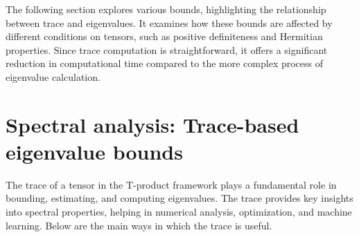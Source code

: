 \documentclass[oupthm]{CUP-JNL-BCM}%
\theoremstyle{oupplain}
\theoremstyle{oupdefinition}
\theoremstyle{oupremark}
\theoremstyle{oupproof}
\numberwithin{equation}{section}
\begin{document}



\noindent The following section explores various bounds, highlighting the relationship between trace and eigenvalues. It examines how these bounds are affected by different conditions on tensors, such as positive definiteness and Hermitian properties. Since trace computation is straightforward, it offers a significant reduction in computational time compared to the more complex process of eigenvalue calculation.

\section{Spectral analysis: Trace-based eigenvalue bounds }\label{results}
The trace of a tensor in the T-product framework plays a fundamental role in bounding, estimating, and computing eigenvalues. The trace provides key insights into spectral properties, helping in numerical analysis, optimization, and machine learning. Below are the main ways in which the trace is useful.

\end{document}

